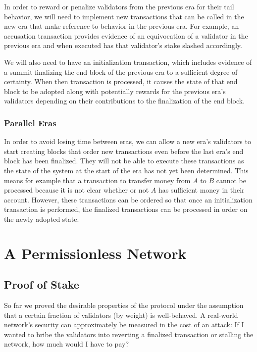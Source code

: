 \documentclass[12pt, fleqn]{article}
\begin{document}
In order to reward or penalize validators from the previous era for their tail behavior, we will need to implement new transactions that can be called in the new era that make reference to behavior in the previous era. For example, an accusation transaction provides evidence of an equivocation of a validator in the previous era and when executed has that validator's stake slashed accordingly.

We will also need to have an initialization transaction, which includes evidence of a summit finalizing the end block of the previous era to a sufficient degree of certainty. When then transaction is processed, it causes the state of that end block to be adopted along with potentially rewards for the previous era's validators depending on their contributions to the finalization of the end block.

\subsubsection{Parallel Eras}

In order to avoid losing time between eras, we can allow a new era's validators to start creating blocks that order new transactions even before the last era's end block has been finalized. They will not be able to execute these transactions as the state of the system at the start of the era has not yet been determined. This means for example that a transaction to transfer money from $A$ to $B$ cannot be processed because it is not clear whether or not $A$ has sufficient money in their account. However, these transactions can be ordered so that once an initialization transaction is performed, the finalized transactions can be processed in order on the newly adopted state.

\section{A Permissionless Network}
\label{sectionPermissionless}


\subsection{Proof of Stake}
\label{sectionPos}

So far we proved the desirable properties of the protocol under the assumption that a certain fraction of validators (by weight) is well-behaved. A real-world network's security can approximately be measured in the cost of an attack: If I wanted to bribe the validators into reverting a finalized transaction or stalling the network, how much would I have to pay?
\end{document}
